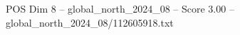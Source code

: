 \begin{textsample}{POS Dim 8 – global\_north\_2024\_08 – Score 3.00 – global\_north\_2024\_08/112605918.txt}
\end{textsample}
